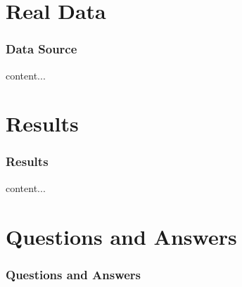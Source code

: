 \documentclass{beamer}
\begin{document}
\section{Real Data}

\begin{frame}
\frametitle{Data Source}
	content...
\end{frame}

\section{Results}

\begin{frame}
\frametitle{Results}
	content...
\end{frame}

\section{Questions and Answers}

\begin{frame}
\frametitle{Questions and Answers}
\end{frame}
\end{document}
